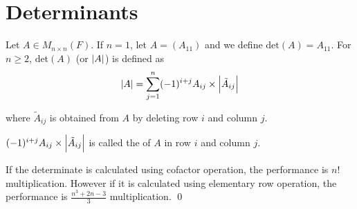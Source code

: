 \section{Determinants}

\begin{definition}
	Let $A \in M_{n \times n} (F)$. If $n =1$, let $A=(A_{11})$ and we define $\text{det}(A) = A_{11}$. For $n \geq 2$, $\text{det}(A)$ (or $\displaystyle \left| \displaystyle A \right|$) is defined as
	\begin{equation}
		\displaystyle \left| \displaystyle A \right| = \sum_{j=1}^n (-1)^{i + j} A_{ij} \times \displaystyle \left| \displaystyle \tilde{A}_{ij} \right|
	\end{equation}
	
	where $\tilde{A}_{ij}$ is obtained from $A$ by deleting row $i$ and column $j$.
	
	$(-1)^{i + j} A_{ij} \times \displaystyle \left| \displaystyle \tilde{A}_{ij} \right|$ is called the  of $A$ in row $i$ and column $j$.
	
	If the determinate is calculated using cofactor operation, the performance is $n!$ multiplication. However if it is calculated using elementary row operation, the performance is $\displaystyle \frac{n^3 + 2n - 3}{3}$ multiplication.
	\qed
\end{definition}


